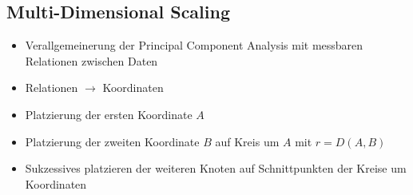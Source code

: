\documentclass[nonacm=true, language=german]{acmart}
\begin{document}
\subsection{Multi-Dimensional Scaling}

\begin{itemize}
    \item Verallgemeinerung der Principal Component Analysis mit messbaren Relationen zwischen Daten
    \item Relationen $\rightarrow$ Koordinaten
    \item Platzierung der ersten Koordinate $A$
    \item Platzierung der zweiten Koordinate $B$ auf Kreis um $A$ mit $ r = D(A,B) $
    \item Sukzessives platzieren der weiteren Knoten auf Schnittpunkten der Kreise um Koordinaten
\end{itemize}
\end{document}
